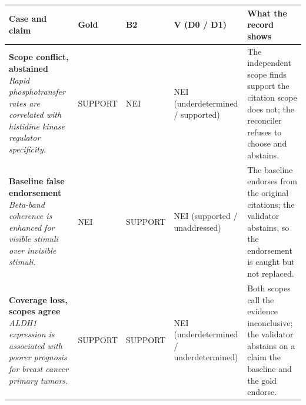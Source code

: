 \footnotesize
\setlength{\tabcolsep}{4pt}
\begin{tabular}{@{}>{\raggedright\arraybackslash}p{}>{\raggedright\arraybackslash}p{}>{\raggedright\arraybackslash}p{}>{\raggedright\arraybackslash}p{}>{\raggedright\arraybackslash}p{}@{}}
\toprule
Case and claim & Gold & B2 & V (D0 / D1) & What the record shows \\
\midrule
\textbf{Scope conflict, abstained}
\newline
\emph{Rapid phosphotransfer rates are correlated with histidine kinase regulator specificity.} & SUPPORT & NEI & NEI (underdetermined / supported) & The independent scope finds support the citation scope does not; the reconciler refuses to choose and abstains. \\[2pt]
\textbf{Baseline false endorsement}
\newline
\emph{Beta-band coherence is enhanced for visible stimuli over invisible stimuli.} & NEI & SUPPORT & NEI (supported / unaddressed) & The baseline endorses from the original citations; the validator abstains, so the endorsement is caught but not replaced. \\[2pt]
\textbf{Coverage loss, scopes agree}
\newline
\emph{ALDH1 expression is associated with poorer prognosis for breast cancer primary tumors.} & SUPPORT & SUPPORT & NEI (underdetermined / underdetermined) & Both scopes call the evidence inconclusive; the validator abstains on a claim the baseline and the gold endorse. \\[2pt]
\bottomrule
\end{tabular}
